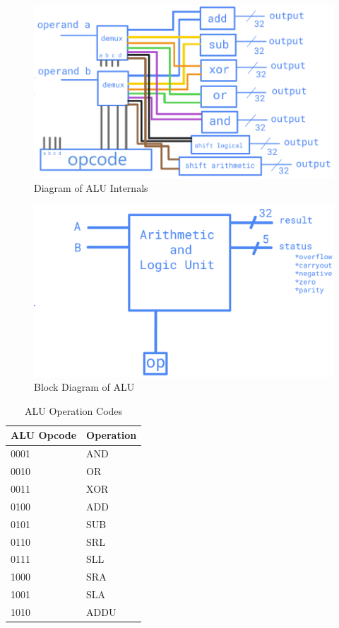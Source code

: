 \documentclass[10pt,letterpaper]{article}
\begin{document}
\begin{figure}[H]
	\centering
	\includegraphics[width=0.7\linewidth]{Figures/ALUDesign1}
	\caption{Diagram of ALU Internals}
	\label{fig:aludesign1}
\end{figure}
\begin{figure}[H]
	\centering
	\includegraphics[width=0.7\linewidth]{Figures/ALUDesign2}
	\caption{Block Diagram of ALU}
	\label{fig:aludesign2}
\end{figure}
\begin{table}[H]
	\centering
	\begin{tabular}{|l|l|}
		\hline
		\multicolumn{1}{|c|}{ALU Opcode} & \multicolumn{1}{c|}{Operation} \\ \hline
		0001                             & AND                            \\ \hline
		0010                             & OR                             \\ \hline
		0011                             & XOR                            \\ \hline
		0100                             & ADD                            \\ \hline
		0101                             & SUB                            \\ \hline
		0110                             & SRL                            \\ \hline
		0111                             & SLL                            \\ \hline
		1000                             & SRA                            \\ \hline
		1001                             & SLA                            \\ \hline
		1010                             & ADDU                           \\ \hline
	\end{tabular}
	\caption{ALU Operation Codes}
	\label{tab:opcodes}
\end{table}
\end{document}
